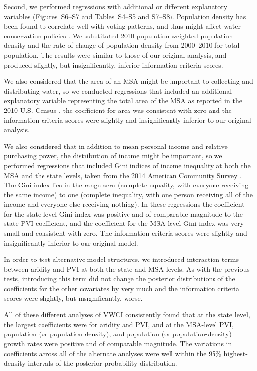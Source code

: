 \documentclass[draft]{agujournal}\usepackage{knitr}
\begin{document}
Second, we performed regressions with additional or different explanatory
variables (Figures~S6--S7 and Tables~S4--S5 and S7--S8).
Population density has been found to correlate well with
voting patterns, and thus might affect water conservation policies
\citep{rodden:geographic:2010}.
We substituted 2010 population-weighted population density
and the rate of change of population density from 2000--2010
\citep{wilson:pop.density:2012}
for total population.
The results were similar to those of our original analysis,
and produced slightly, but insignificantly, inferior information criteria scores.

We also considered that the area of an MSA might be important to collecting and
distributing water, so we conducted regressions that included an additional
explanatory variable representing the total area of the MSA as reported
in the 2010 U.S. Census
\citep{wilson:pop.density:2012}, the coefficient
for area was consistent with zero and the information criteria scores were
slightly and insignificantly inferior to our original analysis.

We also considered that in addition to mean personal
income and relative purchasing power, the distribution of income might be
important, so we performed regressions that included Gini indices of
income inequality at both the MSA and the state levels,
taken from the 2014 American Community Survey \citep{acs:gini:2017}.
The Gini index lies in the range
zero (complete equality, with everyone receiving the same income)
to one (complete inequality, with one person receiving all of the income and
everyone else receiving nothing).
In these regressions the coefficient for the state-level Gini index was
positive and of comparable magnitude to the state-PVI coefficient,
and the coefficient for the MSA-level Gini index was very small and consistent
with zero.
The information criteria scores were slightly and insignificantly inferior
to our original model.

In order to test alternative model structures, we introduced interaction terms
between aridity and PVI at both the state and MSA levels. As with the previous
tests, introducing this term did not change the posterior distributions of the
coefficients for the other covariates by very much and the information criteria
scores were slightly, but insignificantly, worse.

All of these different analyses of VWCI consistently found that
at the state level, the largest coefficients were for aridity and PVI,
and at the MSA-level PVI, population (or population density), and population
(or population-density) growth rates were positive and of comparable magnitude.
The variations in coefficients across all of the alternate analyses
were well within the 95\% highest-density
intervals of the posterior probability distribution.
\end{document}
